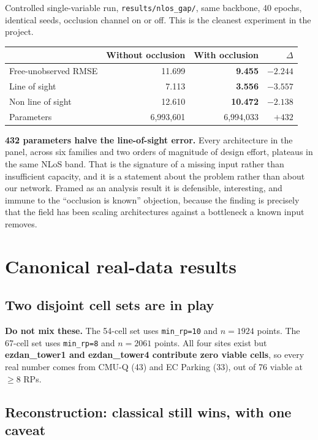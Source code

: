 \documentclass[10pt,a4paper]{article}
\newcommand{\B}[1]{\textcolor{bad}{\textbf{#1}}}
\newcommand{\G}[1]{\textcolor{good}{\textbf{#1}}}
\begin{document}
Controlled single-variable run, \texttt{results/nlos\_gap/}, same backbone, 40 epochs,
identical seeds, occlusion channel on or off. This is the cleanest experiment in the
project.

\begin{center}\small
\begin{tabular}{@{}lrrr@{}}
\toprule
& Without occlusion & With occlusion & $\Delta$ \\ \midrule
Free-unobserved RMSE & 11.699 & \G{9.455} & $-2.244$ \\
Line of sight & 7.113 & \G{3.556} & $-3.557$ \\
Non line of sight & 12.610 & \G{10.472} & $-2.138$ \\
Parameters & 6{,}993{,}601 & 6{,}994{,}033 & \G{$+432$} \\
\bottomrule
\end{tabular}
\end{center}

\textbf{432 parameters halve the line-of-sight error.} Every architecture in the panel,
across six families and two orders of magnitude of design effort, plateaus in the same
NLoS band. That is the signature of a missing input rather than insufficient capacity,
and it is a statement about the problem rather than about our network. Framed as an
analysis result it is defensible, interesting, and immune to the ``occlusion is known''
objection, because the finding is precisely that the field has been scaling
architectures against a bottleneck a known input removes.

\section{Canonical real-data results}

\subsection{Two disjoint cell sets are in play}

\textbf{Do not mix these.} The 54-cell set uses \texttt{min\_rp=10} and $n=1924$ points.
The 67-cell set uses \texttt{min\_rp=8} and $n=2061$ points. All four sites exist but
\B{ezdan\_tower1 and ezdan\_tower4 contribute zero viable cells}, so every real number
comes from CMU-Q (43) and EC Parking (33), out of 76 viable at $\ge8$ RPs.

\subsection{Reconstruction: classical still wins, with one caveat}
\end{document}
